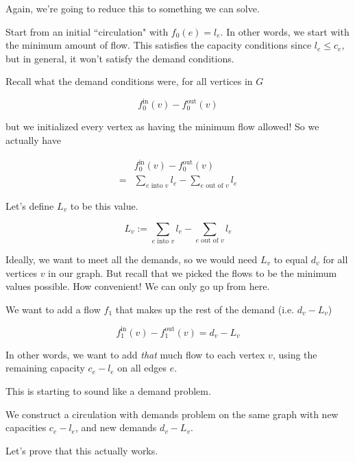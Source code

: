 \documentclass[12pt]{article}
\begin{document}
  Again, we're going to reduce this to something we can solve.

  Start from an initial ``circulation" with $f_0(e) = l_e$. In other words, we
  start with the minimum amount of flow. This satisfies the capacity
  conditions since $l_e \le c_e$, but in general, it won't satisfy the demand
  conditions.

  Recall what the demand conditions were, for all vertices in $G$

  \[
    f_0^\text{in}(v) - f_0^\text{out}(v)
  \]

  but we initialized every vertex as having the minimum flow allowed! So we
  actually have

  \begin{align*}
    &f_0^\text{in}(v) - f_0^\text{out}(v) \\
    =&\sum_{e \text{ into } v} l_e - \sum_{e \text{ out of } v} l_e
  \end{align*}

  Let's define $L_v$ to be this value.

  \[
    L_v := \sum_{e \text{ into } v} l_e - \sum_{e \text{ out of } v} l_e
  \]

  Ideally, we want to meet all the demands, so we would need $L_v$ to equal
  $d_v$ for all vertices $v$ in our graph. But recall that we picked the flows
  to be the minimum values possible. How convenient! We can only go up from
  here.

  We want to add a flow $f_1$ that makes up the rest of the demand (i.e. $d_v -
  L_v$)

  \[
    f_1^\text{in}(v) - f_1^\text{out}(v) = d_v - L_v
  \]

  In other words, we want to add {\it that} much flow to each vertex $v$, using
  the remaining capacity $c_e - l_e$ on all edges $e$.

  This is starting to sound like a demand problem.

  We construct a circulation with demands problem on the same graph with new
  capacities $c_e - l_e$, and new demands $d_v - L_v$.

  Let's prove that this actually works.
\end{document}
